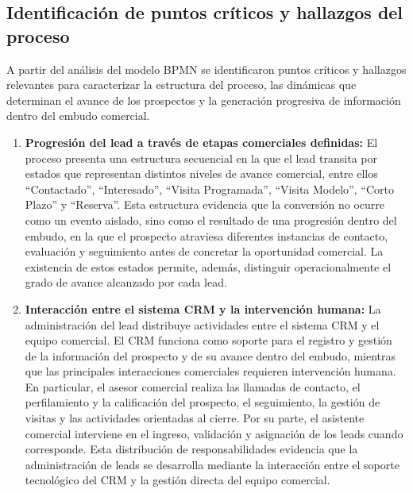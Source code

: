 \subsection{Identificación de puntos críticos y hallazgos del proceso}
\label{subsec:puntos-criticos-hallazgos}

A partir del análisis del modelo BPMN se identificaron puntos críticos y hallazgos relevantes para caracterizar la estructura del proceso, las dinámicas que determinan el avance de los prospectos y la generación progresiva de información dentro del embudo comercial.

\begin{enumerate}

    \item \textbf{Progresión del lead a través de etapas comerciales definidas:}
    El proceso presenta una estructura secuencial en la que el lead transita por estados
    que representan distintos niveles de avance comercial, entre ellos ``Contactado'',
    ``Interesado'', ``Visita Programada'', ``Visita Modelo'', ``Corto Plazo'' y
    ``Reserva''. Esta estructura evidencia que la conversión no ocurre como un evento
    aislado, sino como el resultado de una progresión dentro del embudo, en la que el
    prospecto atraviesa diferentes instancias de contacto, evaluación y seguimiento
    antes de concretar la oportunidad comercial. La existencia de estos estados permite,
    además, distinguir operacionalmente el grado de avance alcanzado por cada lead.

    \item \textbf{Interacción entre el sistema CRM y la intervención humana:}
    La administración del lead distribuye actividades entre el sistema CRM y el equipo
    comercial. El CRM funciona como soporte para el registro y gestión de la información
    del prospecto y de su avance dentro del embudo, mientras que las principales
    interacciones comerciales requieren intervención humana. En particular, el asesor
    comercial realiza las llamadas de contacto, el perfilamiento y la calificación del
    prospecto, el seguimiento, la gestión de visitas y las actividades orientadas al cierre.
    Por su parte, el asistente comercial interviene en el ingreso, validación y asignación
    de los leads cuando corresponde. Esta distribución de responsabilidades evidencia que
    la administración de leads se desarrolla mediante la interacción entre el soporte
    tecnológico del CRM y la gestión directa del equipo comercial.


\end{enumerate}

